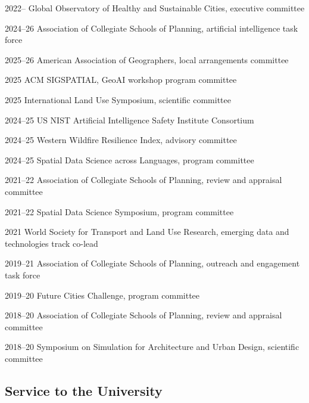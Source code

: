 \documentclass[11pt,a4paper]{report} %
\begin{document}
\begin{tablist}

\item[2022--]   \tab{}Global Observatory of Healthy and Sustainable Cities, executive committee
\item[2024--26] \tab{}Association of Collegiate Schools of Planning, artificial intelligence task force
\item[2025--26] \tab{}American Association of Geographers, local arrangements committee
\item[2025]     \tab{}ACM SIGSPATIAL, GeoAI workshop program committee
\item[2025]     \tab{}International Land Use Symposium, scientific committee
\item[2024--25] \tab{}US NIST Artificial Intelligence Safety Institute Consortium
\item[2024--25] \tab{}Western Wildfire Resilience Index, advisory committee
\item[2024--25] \tab{}Spatial Data Science across Languages, program committee
\item[2021--22] \tab{}Association of Collegiate Schools of Planning, review and appraisal committee
\item[2021--22] \tab{}Spatial Data Science Symposium, program committee
\item[2021]     \tab{}World Society for Transport and Land Use Research, emerging data and technologies track co-lead
\item[2019--21] \tab{}Association of Collegiate Schools of Planning, outreach and engagement task force
\item[2019--20] \tab{}Future Cities Challenge, program committee
\item[2018--20] \tab{}Association of Collegiate Schools of Planning, review and appraisal committee
\item[2018--20] \tab{}Symposium on Simulation for Architecture and Urban Design, scientific committee

\end{tablist}

\subsection*{Service to the University}
\end{document}
